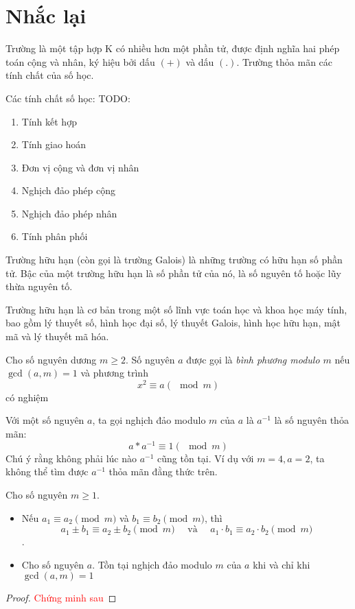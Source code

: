 
\section{Nhắc lại}
\begin{definition}
	Trường là một tập hợp K có nhiều hơn một phần tử, được định nghĩa hai phép toán cộng và nhân,
	ký hiệu bởi dấu $(+)$ và dấu $(.)$. Trường thỏa mãn các tính chất của số học.
\end{definition}
Các tính chất số học:
TODO:
\begin{enumerate}
	\item Tính kết hợp
	\item Tính giao hoán
	\item Đơn vị cộng và đơn vị nhân
	\item Nghịch đảo phép cộng
	\item Nghịch đảo phép nhân
	\item Tính phân phối
\end{enumerate}

\begin{definition}
	Trường hữu hạn (còn gọi là trường Galois) là những trường có hữu hạn số phần tử.
	Bậc của một trường hữu hạn là số phần tử của nó, là số nguyên tố hoặc lũy thừa nguyên tố.
\end{definition}
Trường hữu hạn là cơ bản trong một số lĩnh vực toán học và khoa học máy tính,
bao gồm lý thuyết số, hình học đại số, lý thuyết Galois, hình học hữu hạn, mật mã và lý thuyết mã hóa.

\begin{definition}
	Cho số nguyên dương $m \geq 2$. Số nguyên $a$ được gọi là \textit{bình phương modulo $m$} nếu $\gcd(a,m) = 1$ và phương trình
	$$x^2 \equiv a (\mod{m})$$
	có nghiệm
\end{definition}

\begin{definition}
	Với một số nguyên $a$, ta gọi nghịch đảo modulo $m$ của $a$ là $a^{-1}$ là số nguyên thỏa mãn:
	$$a * a^{-1} \equiv 1 (\mod{m})$$
	Chú ý rằng không phải lúc nào $a^{-1}$ cũng tồn tại. Ví dụ với $m = 4, a = 2$, ta không thể tìm được $a^{-1}$ thỏa mãn đằng thức trên.
\end{definition}
\begin{proposition}
	\label{pr:13}
	Cho số nguyên $m \geq 1$.
	\begin{itemize}
		\item Nếu $a_1 \equiv a_2 \pmod{m}$ và $b_1 \equiv b_2 \pmod{m}$, thì
		      $$a_1 \pm b_1 \equiv a_2 \pm b_2 \pmod{m} \quad \text{ và } \quad a_1 \cdot b_1 \equiv a_2 \cdot b_2 \pmod{m}$$.
		\item Cho số nguyên $a$. Tồn tại nghịch đảo modulo $m$ của $a$ khi và chỉ khi $\gcd(a,m) = 1$
	\end{itemize}
\end{proposition}
\begin{proof}
	\textcolor{red}{Chứng minh sau}
\end{proof}

